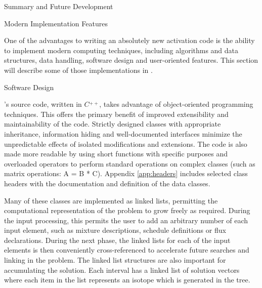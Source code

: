 
\begin{chapter}{Summary and Future Development}
  
  \begin{section}{Modern Implementation Features\label{sec:summary.modern}}
    
    One of the advantages to writing an absolutely new activation code
    is the ability to implement modern computing techniques, including
    algorithms and data structures, data handling, software design and
    user-oriented features.  This section will describe some of those
    implementations in \ALARA.

    \begin{subsection}{Software Design}
      
      \ALARA's source code, written in $C\!\!\!\stackrel{+\!\!+}{}$,
      takes advantage of object-oriented programming techniques.  This
      offers the primary benefit of improved extensibility and
      maintainability of the code.  Strictly designed classes with
      appropriate inheritance, information hiding and well-documented
      interfaces minimize the unpredictable effects of isolated
      modifications and extensions.  The code is also made more
      readable by using short functions with specific purposes and
      overloaded operators to perform standard operations on complex
      classes (such as matrix operations: A = B * C).  Appendix
      \ref{app:headers} includes selected class headers with the
      documentation and definition of the data classes.
      
      Many of these classes are implemented as linked lists,
      permitting the computational representation of the problem to
      grow freely as required.  During the input processing, this
      permits the user to add an arbitrary number of each input
      element, such as mixture descriptions, schedule definitions or
      flux declarations.  During the next phase, the linked lists for
      each of the input elements is then conveniently cross-referenced
      to accelerate future searches and linking in the problem.  The
      linked list structures are also important for accumulating the
      solution.  Each interval has a linked list of solution vectors
      where each item in the list represents an isotope which is
      generated in the tree.
    \end{subsection}


\end{section}
\end{chapter}
